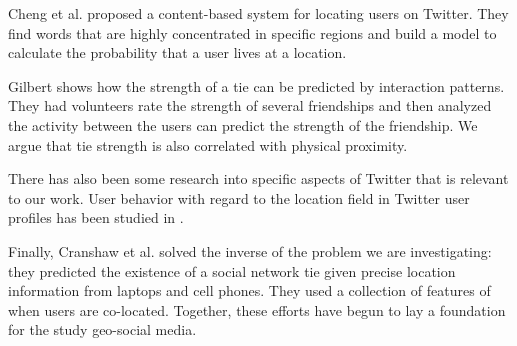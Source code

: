 
Cheng et al. \cite{cheng2010you} proposed a
content-based system for locating users on Twitter. They find words that are
highly concentrated in specific regions and build a model to calculate the
probability that a user lives at a location.

Gilbert \cite{gilbert2009predicting} shows how the strength of a tie can be
predicted by interaction patterns.  They had volunteers rate the strength of
several friendships and then analyzed the activity between the users can
predict the strength of the friendship.  We argue that tie strength is also
correlated with physical proximity.

There has also been some research into specific aspects of Twitter that is
relevant to our work.  User behavior with regard to the location field in
Twitter user profiles has been studied in \cite{hecht2011tweets}.


Finally, Cranshaw et al. \cite{cranshaw2010bridging} solved the inverse of the
problem we are investigating: they predicted the existence of a social network
tie given precise location information from laptops and cell phones. They used
a collection of features of when users are co-located.  Together, these efforts
have begun to lay a foundation for the study geo-social media.

